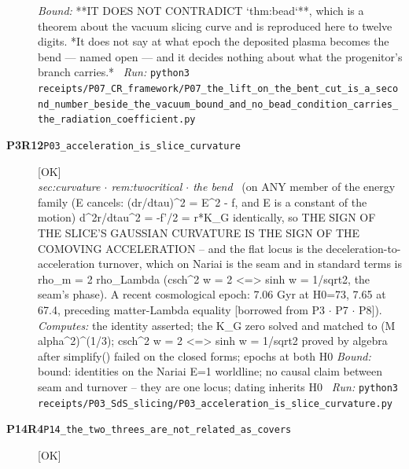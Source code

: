 \begin{description}
 \emph{Bound:}  **IT DOES NOT CONTRADICT `thm:bead`**, which is a theorem about the vacuum slicing curve and is reproduced here to twelve digits. *It does not say at what epoch the deposited plasma becomes the bend --- named open --- and it decides nothing about what the progenitor's branch carries.*
\ \emph{Run:} \texttt{python3 receipts/P07\_CR\_framework/P07\_the\_lift\_on\_the\_bent\_cut\_is\_a\_second\_number\_beside\_the\_vacuum\_bound\_and\_no\_bead\_condition\_carries\_the\_radiation\_coefficient.py}
\item[\rcptlabel{P03_acceleration_is_slice_curvature}{P3R12}\textbf{P3R12}\quad\texttt{P03\_acceleration\_is\_slice\_curvature}]\hfill\textsf{[OK]}\\
\textit{sec:curvature \ensuremath{\cdot} rem:twocritical \ensuremath{\cdot} the bend} \ (on ANY member of the energy family (E cancels: (dr/dtau)\textasciicircum{}2 = E\textasciicircum{}2 - f, and E is a constant of the motion) d\textasciicircum{}2r/dtau\textasciicircum{}2 = -f'/2 = r*K\_G identically, so THE SIGN OF THE SLICE'S GAUSSIAN CURVATURE IS THE SIGN OF THE COMOVING ACCELERATION -- and the flat locus is the deceleration-to-acceleration turnover, which on Nariai is the seam and in standard terms is rho\_m = 2 rho\_Lambda (csch\textasciicircum{}2 w = 2 <=> sinh w = 1/sqrt2, the seam's phase). A recent cosmological epoch: 7.06 Gyr at H0=73, 7.65 at 67.4, preceding matter-Lambda equality [borrowed from P3 \ensuremath{\cdot} P7 \ensuremath{\cdot} P8]). 
\emph{Computes:} the identity asserted; the K\_G zero solved and matched to (M alpha\textasciicircum{}2)\textasciicircum{}(1/3); csch\textasciicircum{}2 w = 2 <=> sinh w = 1/sqrt2 proved by algebra after simplify() failed on the closed forms; epochs at both H0
 \emph{Bound:} bound: identities on the Nariai E=1 worldline; no causal claim between seam and turnover -- they are one locus; dating inherits H0
\ \emph{Run:} \texttt{python3 receipts/P03\_SdS\_slicing/P03\_acceleration\_is\_slice\_curvature.py}
\item[\rcptlabel{P14_the_two_threes_are_not_related_as_covers}{P14R4}\textbf{P14R4}\quad\texttt{P14\_the\_two\_threes\_are\_not\_related\_as\_covers}]\hfill\textsf{[OK]}\\

\end{description}

